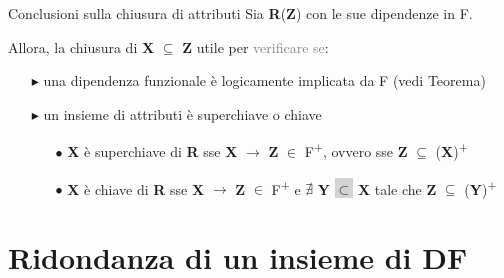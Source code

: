 \documentclass{beamer}
\begin{document}
\begin{frame}{Conclusioni sulla chiusura di attributi}
    Sia \textbf{R}(\textbf{Z}) con le sue dipendenze in F. \par Allora, la chiusura di \textbf{X} $\subseteq$ \textbf{Z} utile per \textcolor{gray}{verificare se}:
    \begin{itemize}
        \item[$\blacktriangleright$] una dipendenza funzionale è logicamente implicata da F (vedi Teorema)
        \item[$\blacktriangleright$] un insieme di attributi è superchiave o chiave
        \begin{itemize}
            \item[$\bullet$] \textbf{X} è superchiave di \textbf{R} sse \textbf{X} $\rightarrow$ \textbf{Z} $\in$ F\textsuperscript{+}, ovvero sse \textbf{Z} $\subseteq$ (\textbf{X})\textsuperscript{+}
            \item[$\bullet$] \textbf{X} è chiave di \textbf{R} sse \textbf{X} $\rightarrow$ \textbf{Z} $\in$ F\textsuperscript{+} e $\nexists$ \textbf{Y} \colorbox{lightgray}{$\subset$} \textbf{X} tale che \textbf{Z} $\subseteq$ (\textbf{Y})\textsuperscript{+}
        \end{itemize}
    \end{itemize}
\end{frame}


\section{Ridondanza di un insieme di DF}
\end{document}
